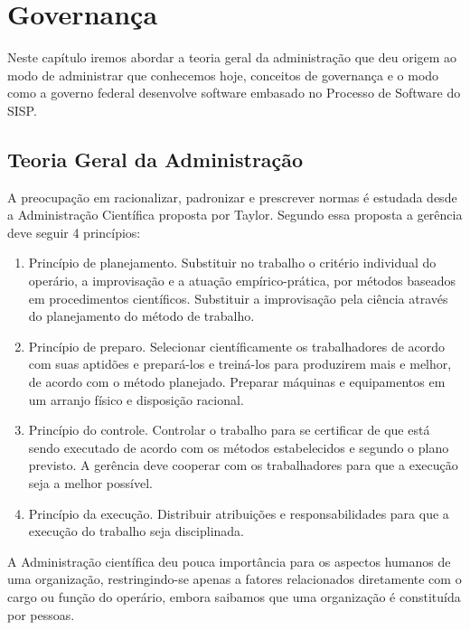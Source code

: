 \chapter[Governança]{Governança}

Neste capítulo iremos abordar a teoria geral da administração que deu origem 
ao modo de administrar que conhecemos hoje, conceitos de governança e o modo 
como a governo federal desenvolve software embasado no Processo de Software
do SISP.

\section{Teoria Geral da Administração}

A preocupação em racionalizar, padronizar e prescrever normas é estudada desde a 
Administração Científica proposta por Taylor. Segundo essa proposta a gerência 
deve seguir 4 princípios:\cite{chiavenato2001teoria}

\begin{enumerate}
\item Princípio de planejamento. Substituir no trabalho o critério individual 
do operário, a improvisação e a atuação empírico-prática, por métodos baseados 
em procedimentos científicos. Substituir a improvisação pela ciência através
do planejamento do método de trabalho.
 
\item Princípio de preparo. Selecionar científicamente os trabalhadores de acordo 
com suas aptidões e prepará-los e treiná-los para produzirem mais e melhor, de 
acordo com o método planejado. Preparar máquinas e equipamentos em um arranjo 
físico e disposição racional.

\item Princípio do controle. Controlar o trabalho para se certificar de que está 
sendo executado de acordo com os métodos estabelecidos e segundo o plano previsto. 
A gerência deve cooperar com os trabalhadores para que a execução seja a melhor 
possível.

\item Princípio da execução. Distribuir atribuições e responsabilidades para 
que a execução do trabalho seja disciplinada.
\end{enumerate}

A Administração científica deu pouca importância para os aspectos humanos de uma
organização, restringindo-se apenas a fatores relacionados diretamente com o 
cargo ou função do operário, embora saibamos que uma organização é constituída 
por pessoas.

